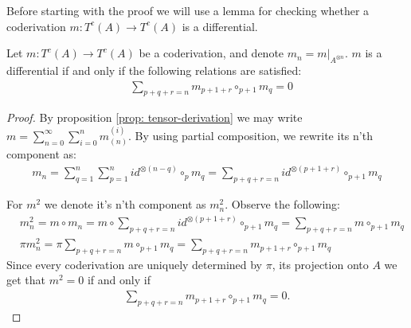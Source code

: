 \documentclass[../thesis.tex]{subfiles}
\begin{document}
        Before starting with the proof we will use a lemma for checking whether a coderivation $m: T^c(A) \rightarrow T^c(A)$ is a differential.

        \begin{lemma}\label{lem: coderivation-is-diff?}
            Let $m: T^c(A) \rightarrow T^c(A)$ be a coderivation, and denote $m_n = m|_{A^{\otimes n}}$. $m$ is a differential if and only if the following relations are satisfied:
            \begin{align*}
                & \sum_{p+q+r = n}m_{p+1+r}\circ_{p+1}m_q = 0
            \end{align*}
        \end{lemma}

        \begin{proof}
            By proposition \ref{prop: tensor-derivation} we may write $m = \sum_{n = 0}^\infty \sum_{i = 0}^n m_{(n)}^{(i)}$. By using partial composition, we rewrite its n'th component as:
            \begin{align*}
                m_n = \sum_{q=1}^n\sum_{p = 1}^n id^{\otimes (n-q)}\circ_{p} m_q = \sum_{p + q + r = n}id^{\otimes (p+1+r)}\circ_{p+1}m_q
            \end{align*}

            For $m^2$ we denote it's n'th component as $m^2_n$. Observe the following:
            \begin{align*}
                & m^2_n = m\circ m_n = m\circ \sum_{p + q + r = n}id^{\otimes (p+1+r)}\circ_{p+1}m_q = \sum_{p + q + r = n}m\circ_{p+1}m_q \\
                & \pi m^2_n = \pi \sum_{p + q + r = n}m\circ_{p+1}m_q = \sum_{p + q + r = n}m_{p+1+r}\circ_{p+1}m_q
            \end{align*}
            Since every coderivation are uniquely determined by $\pi$, its projection onto $A$ we get that $m^2 = 0$ if and only if
            \begin{align*}
                \sum_{p+q+r = n}m_{p+1+r}\circ_{p+1}m_q = 0\text{.}
            \end{align*}
        \end{proof}
\end{document}
